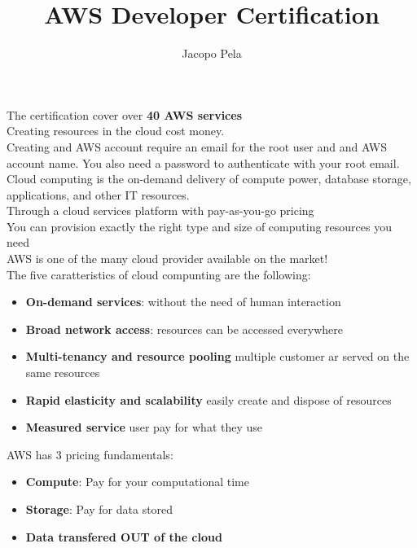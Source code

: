 \documentclass[12pt, letterpaper, twoside]{article}
\title{AWS Developer Certification}
\author{Jacopo Pela}
\begin{document}
\begin{titlepage}
\maketitle
\end{titlepage}

\tableofcontents
\newpage

The certification cover over \textbf{40 AWS services}\\
Creating resources in the cloud cost money.\\

Creating and AWS account require an email for the root user and and AWS account name.
You also need a password to authenticate with your root email.\\

Cloud computing is the on-demand delivery of compute power, database storage,
applications, and other IT resources.\\
Through a cloud services platform with pay-as-you-go pricing\\
You can provision exactly the right type and size of computing resources you need\\

AWS is one of the many cloud provider available on the market!\\

The five caratteristics of cloud compunting are the following:
\begin{itemize}
	\item \textbf{On-demand services}: without the need of human interaction 
	\item \textbf{Broad network access}: resources can be accessed everywhere
	\item \textbf{Multi-tenancy and resource pooling} multiple customer ar served on the same resources
	\item \textbf{Rapid elasticity and scalability} easily create and dispose of resources 
	\item \textbf{Measured service}	user pay for what they use 
\end{itemize}

AWS has 3 pricing fundamentals:
\begin{itemize}
	\item \textbf{Compute}: Pay for your computational time 
	\item \textbf{Storage}: Pay for data stored 
	\item \textbf{Data transfered OUT of the cloud} 
\end{itemize}
\end{document}
